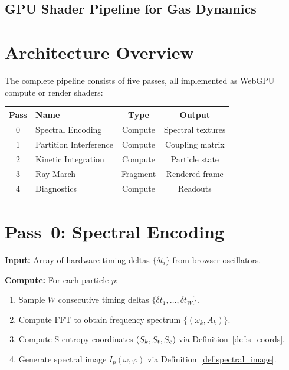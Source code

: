 
\subsection{GPU Shader Pipeline for Gas Dynamics}
\label{part:pipeline}

\section{Architecture Overview}
\label{sec:architecture}

The complete pipeline consists of five passes, all implemented as WebGPU compute or render shaders:

\begin{center}
\begin{tabular}{clcc}
\toprule
\textbf{Pass} & \textbf{Name} & \textbf{Type} & \textbf{Output} \\
\midrule
0 & Spectral Encoding      & Compute & Spectral textures \\
1 & Partition Interference  & Compute & Coupling matrix \\
2 & Kinetic Integration     & Compute & Particle state \\
3 & Ray March               & Fragment & Rendered frame \\
4 & Diagnostics             & Compute & Readouts \\
\bottomrule
\end{tabular}
\end{center}

\section{Pass~0: Spectral Encoding}
\label{sec:pass0}

\textbf{Input:} Array of hardware timing deltas $\{\delta t_i\}$ from browser oscillators.

\textbf{Compute:} For each particle $p$:
\begin{enumerate}
    \item Sample $W$ consecutive timing deltas $\{\delta t_1, \ldots, \delta t_W\}$.
    \item Compute FFT to obtain frequency spectrum $\{(\omega_k, A_k)\}$.
    \item Compute S-entropy coordinates $(S_k, S_t, S_e)$ via Definition~\ref{def:s_coords}.
    \item Generate spectral image $I_p(\omega, \varphi)$ via Definition~\ref{def:spectral_image}.
\end{enumerate}

